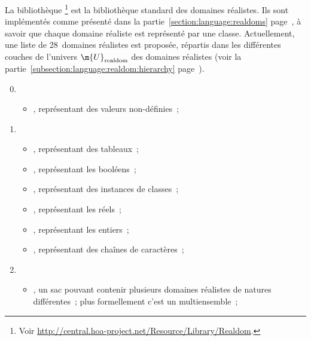 La bibliothèque \footnote{Voir
\url{http://central.hoa-project.net/Resource/Library/Realdom}.} est la
bibliothèque standard des domaines réalistes. Ils sont implémentés comme
présenté dans la partie~\ref{section:language:realdoms}
page~\pageref{section:language:realdoms}, à savoir que chaque domaine réaliste
est représenté par une classe. Actuellement, une liste de 28~domaines réalistes
est proposée, répartis dans les différentes couches de l'univers
$\m{U}_\mathrm{realdom}$ des domaines réalistes (voir la
partie~\ref{subsection:language:realdom:hierarchy}
page~\pageref{subsection:language:realdom:hierarchy}).
%
\begin{enumerate}[couche 1]
\setcounter{enumi}{-1}

\item
    \begin{itemize}

    \item {}, représentant des valeurs non-définies~;

    \end{itemize}

\item
    \begin{itemize}

    \item {}, représentant des tableaux~;

    \item {}, représentant les booléens~;

    \item {}, représentant des instances de classes~;

    \item {}, représentant les réels~;

    \item {}, représentant les entiers~;

    \item {}, représentant des chaînes de caractères~;

    \end{itemize}

\item
    \begin{itemize}

    \item {}, un sac pouvant contenir plusieurs domaines réalistes de
    natures différentes~; plus formellement c'est un multiensemble~;


\end{itemize}
\end{enumerate}
